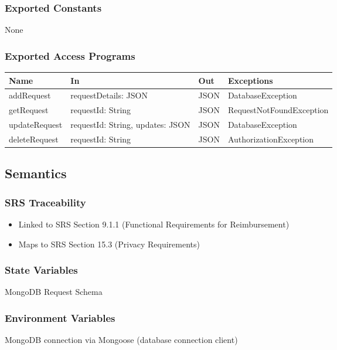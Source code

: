 \documentclass[12pt, titlepage]{article}
\begin{document}
\subsubsection{Exported Constants}
None

\subsubsection{Exported Access Programs}

\begin{center}
\begin{tabular}{p{4cm} p{4cm} p{2cm} p{4cm}}
\hline
\textbf{Name} & \textbf{In} & \textbf{Out} & \textbf{Exceptions} \\
\hline
addRequest & requestDetails: JSON & JSON & DatabaseException \\
getRequest & requestId: String & JSON & RequestNotFoundException \\
updateRequest & requestId: String, updates: JSON & JSON & DatabaseException \\
deleteRequest & requestId: String & JSON & AuthorizationException \\
\hline
\end{tabular}
\end{center}

\subsection{Semantics}

\subsubsection{SRS Traceability}
\begin{itemize}
  \item Linked to SRS Section 9.1.1 (Functional Requirements for Reimbursement)
  \item Maps to SRS Section 15.3 (Privacy Requirements)
\end{itemize}

\subsubsection{State Variables}
MongoDB Request Schema

\subsubsection{Environment Variables}
MongoDB connection via Mongoose (database connection client)
\end{document}
